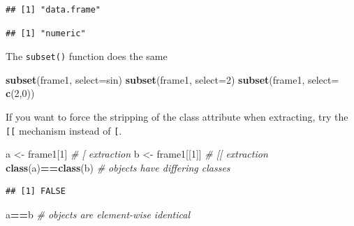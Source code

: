 \documentclass[]{book}
\newenvironment{Shaded}{\begin{snugshade}}{\end{snugshade}}
\newcommand{\CommentTok}[1]{\textcolor[rgb]{0.56,0.35,0.01}{\textit{#1}}}
\newcommand{\DataTypeTok}[1]{\textcolor[rgb]{0.13,0.29,0.53}{#1}}
\newcommand{\DecValTok}[1]{\textcolor[rgb]{0.00,0.00,0.81}{#1}}
\newcommand{\KeywordTok}[1]{\textcolor[rgb]{0.13,0.29,0.53}{\textbf{#1}}}
\newcommand{\NormalTok}[1]{#1}
\newcommand{\OperatorTok}[1]{\textcolor[rgb]{0.81,0.36,0.00}{\textbf{#1}}}
\newcommand{\StringTok}[1]{\textcolor[rgb]{0.31,0.60,0.02}{#1}}
\theoremstyle{definition}
\theoremstyle{definition}
\theoremstyle{definition}
\theoremstyle{remark}
\begin{document}
\begin{verbatim}
## [1] "data.frame"
\end{verbatim}

\begin{Shaded}
\end{Shaded}

\begin{verbatim}
## [1] "numeric"
\end{verbatim}

The \texttt{subset()} function does the same

\begin{Shaded}
\begin{Highlighting}[]
\KeywordTok{subset}\NormalTok{(frame1, }\DataTypeTok{select=}\NormalTok{sin) }
\KeywordTok{subset}\NormalTok{(frame1, }\DataTypeTok{select=}\DecValTok{2}\NormalTok{)}
\KeywordTok{subset}\NormalTok{(frame1, }\DataTypeTok{select=} \KeywordTok{c}\NormalTok{(}\DecValTok{2}\NormalTok{,}\DecValTok{0}\NormalTok{))}
\end{Highlighting}
\end{Shaded}

If you want to force the stripping of the class attribute when extracting, try the \texttt{{[}{[}} mechanism instead of \texttt{{[}}.

\begin{Shaded}
\begin{Highlighting}[]
\NormalTok{a <-}\StringTok{ }\NormalTok{frame1[}\DecValTok{1}\NormalTok{] }\CommentTok{# [ extraction}
\NormalTok{b <-}\StringTok{ }\NormalTok{frame1[[}\DecValTok{1}\NormalTok{]] }\CommentTok{# [[ extraction}
\KeywordTok{class}\NormalTok{(a)}\OperatorTok{==}\KeywordTok{class}\NormalTok{(b) }\CommentTok{# objects have differing classes}
\end{Highlighting}
\end{Shaded}

\begin{verbatim}
## [1] FALSE
\end{verbatim}

\begin{Shaded}
\begin{Highlighting}[]
\NormalTok{a}\OperatorTok{==}\NormalTok{b }\CommentTok{# objects are element-wise identical }
\end{Highlighting}
\end{Shaded}
\end{document}
